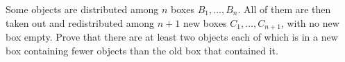 Some objects are distributed among $n$ boxes $B_1,\dots,B_n$. All of them are then taken out and redistributed among $n+1$ new boxes $C_1,\dots,C_{n+1}$, with no new box empty. Prove that there are at least two objects each of which is in a new box containing fewer objects than the old box that contained it.
